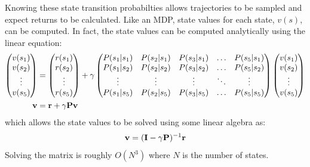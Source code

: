 \documentclass[a4paper,11pt]{article}
\begin{document}
Knowing these state transition probabilties allows trajectories to be sampled and expect returns to be calculated.  Like an MDP, state values for each state, $v(s)$, can be computed.  In fact, the state values can be computed analytically using the linear equation:
\begin{equation} \label{eqn:linear_eqn_for_mrp}
\begin{split}
        \begin{pmatrix}
            v(s_1) \\
            v(s_2) \\
            \vdots \\
            v(s_5)
        \end{pmatrix} &=
        \begin{pmatrix}
            r(s_1) \\
            r(s_2) \\
            \vdots \\
            r(s_5)
        \end{pmatrix} +
        \gamma 
        \begin{pmatrix}
            P(s_1|s_1) & P(s_2|s_1) & P(s_3|s_1) & \hdots & P(s_5|s_1) \\
            P(s_1|s_2) & P(s_2|s_2) & P(s_3|s_2) & \hdots & P(s_5|s_2) \\
            \vdots & \vdots & \vdots & \ddots & \vdots \\
            P(s_1|s_5) & P(s_2|s_5) & P(s_3|s_5) & \hdots & P(s_5|s_5)
        \end{pmatrix}
        \begin{pmatrix}
            v(s_1) \\
            v(s_2) \\
            \vdots \\
            v(s_5)
        \end{pmatrix} 
        \\
        {\bf v} &= {\bf r} + \gamma {\bf P} {\bf v} 
\end{split}
\end{equation}
which allows the state values to be solved using some linear algebra as:
\begin{equation} \label{eqn:inverse_of_linear_eqn_for_mrp}
\begin{split}
    {\bf v} = ({\bf I} - \gamma {\bf P})^{-1} {\bf r}
\end{split}
\end{equation}
Solving the matrix is roughly $O(N^3)$ where $N$ is the number of states.
\end{document}
